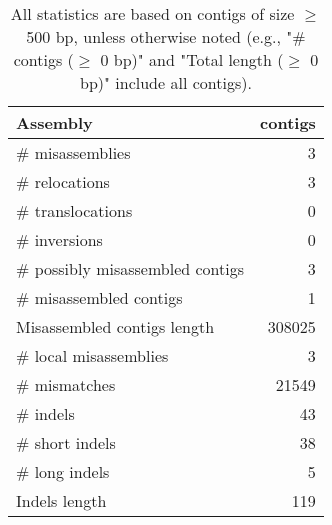 \documentclass[12pt,a4paper]{article}
\begin{document}
\begin{table}[ht]
\begin{center}
\caption{All statistics are based on contigs of size $\geq$ 500 bp, unless otherwise noted (e.g., "\# contigs ($\geq$ 0 bp)" and "Total length ($\geq$ 0 bp)" include all contigs).}
\begin{tabular}{|l*{1}{|r}|}
\hline
Assembly & contigs \\ \hline
\# misassemblies & 3 \\ \hline
\hspace{5mm}\# relocations & 3 \\ \hline
\hspace{5mm}\# translocations & 0 \\ \hline
\hspace{5mm}\# inversions & 0 \\ \hline
\# possibly misassembled contigs & 3 \\ \hline
\# misassembled contigs & 1 \\ \hline
Misassembled contigs length & 308025 \\ \hline
\# local misassemblies & 3 \\ \hline
\# mismatches & 21549 \\ \hline
\# indels & 43 \\ \hline
\hspace{5mm}\# short indels & 38 \\ \hline
\hspace{5mm}\# long indels & 5 \\ \hline
Indels length & 119 \\ \hline
\end{tabular}
\end{center}
\end{table}
\end{document}

